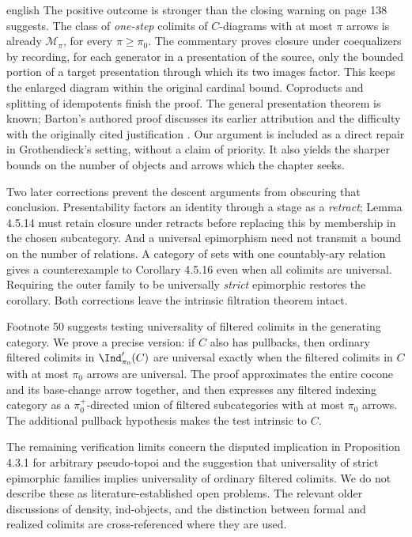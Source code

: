 \begin{otherlanguage*}{english}
The positive outcome is stronger than the closing warning on page 138 suggests. The class of \emph{one-step} colimits of $C$-diagrams with at most $\pi$ arrows is already $\mathcal M_\pi$, for every $\pi\geq\pi_0$. The commentary proves closure under coequalizers by recording, for each generator in a presentation of the source, only the bounded portion of a target presentation through which its two images factor. This keeps the enlarged diagram within the original cardinal bound. Coproducts and splitting of idempotents finish the proof. The general presentation theorem is known; Barton's authored proof discusses its earlier attribution and the difficulty with the originally cited justification \citep{Barton2019Presentable}. Our argument is included as a direct repair in Grothendieck's setting, without a claim of priority. It also yields the sharper bounds on the number of objects and arrows which the chapter seeks.

Two later corrections prevent the descent arguments from obscuring that conclusion. Presentability factors an identity through a stage as a \emph{retract}; Lemma 4.5.14 must retain closure under retracts before replacing this by membership in the chosen subcategory. And a universal epimorphism need not transmit a bound on the number of relations. A category of sets with one countably-ary relation gives a counterexample to Corollary 4.5.16 even when all colimits are universal. Requiring the outer family to be universally \emph{strict} epimorphic restores the corollary. Both corrections leave the intrinsic filtration theorem intact.

Footnote 50 suggests testing universality of filtered colimits in the generating category. We prove a precise version: if $C$ also has pullbacks, then ordinary filtered colimits in $\Ind'_{\pi_0}(C)$ are universal exactly when the filtered colimits in $C$ with at most $\pi_0$ arrows are universal. The proof approximates the entire cocone and its base-change arrow together, and then expresses any filtered indexing category as a $\pi_0^+$-directed union of filtered subcategories with at most $\pi_0$ arrows. The additional pullback hypothesis makes the test intrinsic to $C$.

The remaining verification limits concern the disputed implication in Proposition 4.3.1 for arbitrary pseudo-topoi and the suggestion that universality of strict epimorphic families implies universality of ordinary filtered colimits. We do not describe these as literature-established open problems. The relevant older discussions of density, ind-objects, and the distinction between formal and realized colimits are cross-referenced where they are used.
\end{otherlanguage*}
